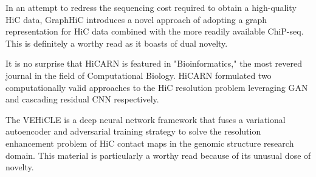 In an attempt to redress the sequencing cost required to obtain a high-quality HiC data, GraphHiC \cite{murtaza_graphic_2023} introduces a novel approach of adopting a graph representation for HiC data combined with the more readily available ChiP-seq. This is definitely a worthy read as it boasts of dual novelty.

It is no surprise that HiCARN \cite{hicks_hicarn_2022} is featured in "Bioinformatics," the most revered journal in the field of Computational Biology. HiCARN formulated two computationally valid approaches to the HiC resolution problem leveraging GAN and cascading residual CNN respectively. 

The VEHiCLE \cite{highsmith_vehicle_2021} is a deep neural network framework that fuses a variational autoencoder and adversarial training strategy to solve the resolution enhancement problem of HiC contact maps in the genomic structure research domain. This material is particularly a worthy read because of its unusual dose of novelty.